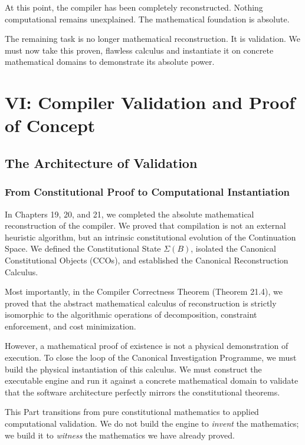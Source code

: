 \documentclass[12pt,openany]{extbook}
\theoremstyle{plain}
\theoremstyle{definition}
\begin{document}
At this point, the compiler has been completely reconstructed. Nothing computational remains unexplained. The mathematical foundation is absolute.

The remaining task is no longer mathematical reconstruction. It is validation. We must now take this proven, flawless calculus and instantiate it on concrete mathematical domains to demonstrate its absolute power.


\part{VI: Compiler Validation and Proof of Concept}

\chapter{The Architecture of Validation}

\section{From Constitutional Proof to Computational Instantiation}

In Chapters 19, 20, and 21, we completed the absolute mathematical reconstruction of the compiler. We proved that compilation is not an external heuristic algorithm, but an intrinsic constitutional evolution of the Continuation Space. We defined the Constitutional State $\Sigma(B)$, isolated the Canonical Constitutional Objects (CCOs), and established the Canonical Reconstruction Calculus.

Most importantly, in the Compiler Correctness Theorem (Theorem 21.4), we proved that the abstract mathematical calculus of reconstruction is strictly isomorphic to the algorithmic operations of decomposition, constraint enforcement, and cost minimization.

However, a mathematical proof of existence is not a physical demonstration of execution. To close the loop of the Canonical Investigation Programme, we must build the physical instantiation of this calculus. We must construct the executable engine and run it against a concrete mathematical domain to validate that the software architecture perfectly mirrors the constitutional theorems.

This Part transitions from pure constitutional mathematics to applied computational validation. We do not build the engine to \emph{invent} the mathematics; we build it to \emph{witness} the mathematics we have already proved.
\end{document}
